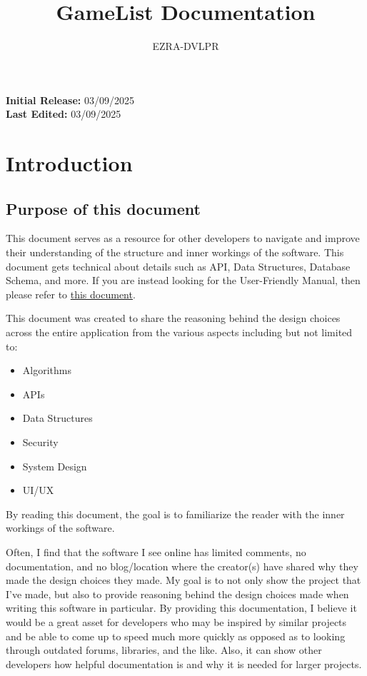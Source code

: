\documentclass[letterpaper,12pt]{article}
\begin{document}
\title{GameList Documentation}

\author{EZRA-DVLPR}

\date{} %

\maketitle

\begin{center}
	\textbf{Initial Release:} 03/09/2025\\
	\textbf{Last Edited:} 03/09/2025\\
\end{center}

\tableofcontents

\newpage

\section{Introduction}

\subsection{Purpose of this document}
This document serves as a resource for other developers to navigate
and improve their understanding of the structure and inner workings
of the software. This document gets technical about details such as API, Data
Structures, Database Schema, and more.
If you are instead looking for the User-Friendly Manual, then
please refer to
\href{https://github.com/EZRA-DVLPR/GameList/blob/main/docs/PDF/Manual.pdf}{this
document}.

This document was created to share the reasoning behind the design
choices across the entire
application from the various aspects including but not limited to:
\begin{itemize}
	\item Algorithms
	\item APIs
	\item Data Structures
	\item Security
	\item System Design
	\item UI/UX
\end{itemize}
By reading this document, the goal is to familiarize the reader with
the inner workings of the software.

Often, I find that the software I see online has limited comments, no
documentation, and no blog/location where the creator(s) have shared
why they made the design choices they made.
My goal is to not only show the project that I've made, but also to
provide reasoning behind the design choices made
when writing this software in particular. By providing this documentation, I
believe it would be a great asset for
developers who may be inspired by similar projects and be able to
come up to speed much more quickly as opposed as to looking through
outdated forums, libraries, and the like.
Also, it can show other developers how helpful
documentation is and why it is needed for larger projects.
\end{document}
